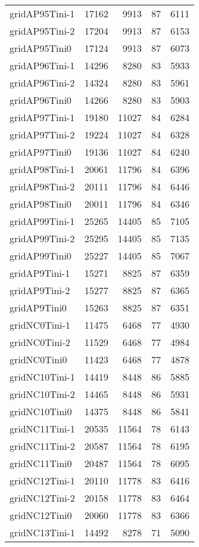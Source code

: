 \documentclass[../../../thesis.tex]{subfiles}
\begin{document}
\begin{longtable}{lrrrr}
gridAP95Tini-1 & 17162 & 9913 & 87 & 6111 \\
gridAP95Tini-2 & 17204 & 9913 & 87 & 6153 \\
gridAP95Tini0 & 17124 & 9913 & 87 & 6073 \\
gridAP96Tini-1 & 14296 & 8280 & 83 & 5933 \\
gridAP96Tini-2 & 14324 & 8280 & 83 & 5961 \\
gridAP96Tini0 & 14266 & 8280 & 83 & 5903 \\
gridAP97Tini-1 & 19180 & 11027 & 84 & 6284 \\
gridAP97Tini-2 & 19224 & 11027 & 84 & 6328 \\
gridAP97Tini0 & 19136 & 11027 & 84 & 6240 \\
gridAP98Tini-1 & 20061 & 11796 & 84 & 6396 \\
gridAP98Tini-2 & 20111 & 11796 & 84 & 6446 \\
gridAP98Tini0 & 20011 & 11796 & 84 & 6346 \\
gridAP99Tini-1 & 25265 & 14405 & 85 & 7105 \\
gridAP99Tini-2 & 25295 & 14405 & 85 & 7135 \\
gridAP99Tini0 & 25227 & 14405 & 85 & 7067 \\
gridAP9Tini-1 & 15271 & 8825 & 87 & 6359 \\
gridAP9Tini-2 & 15277 & 8825 & 87 & 6365 \\
gridAP9Tini0 & 15263 & 8825 & 87 & 6351 \\
gridNC0Tini-1 & 11475 & 6468 & 77 & 4930 \\
gridNC0Tini-2 & 11529 & 6468 & 77 & 4984 \\
gridNC0Tini0 & 11423 & 6468 & 77 & 4878 \\
gridNC10Tini-1 & 14419 & 8448 & 86 & 5885 \\
gridNC10Tini-2 & 14465 & 8448 & 86 & 5931 \\
gridNC10Tini0 & 14375 & 8448 & 86 & 5841 \\
gridNC11Tini-1 & 20535 & 11564 & 78 & 6143 \\
gridNC11Tini-2 & 20587 & 11564 & 78 & 6195 \\
gridNC11Tini0 & 20487 & 11564 & 78 & 6095 \\
gridNC12Tini-1 & 20110 & 11778 & 83 & 6416 \\
gridNC12Tini-2 & 20158 & 11778 & 83 & 6464 \\
gridNC12Tini0 & 20060 & 11778 & 83 & 6366 \\
gridNC13Tini-1 & 14492 & 8278 & 71 & 5090 \\

\end{longtable}
\end{document}
